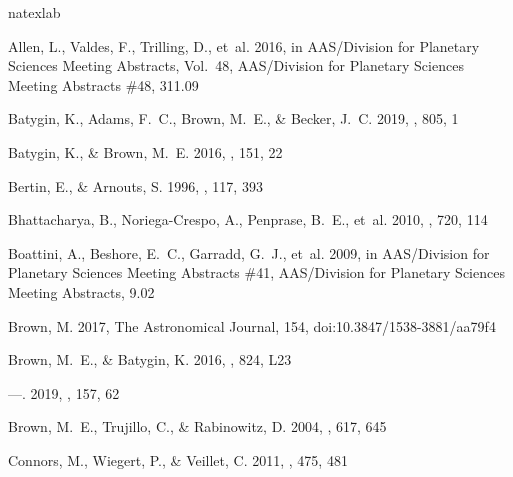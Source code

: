 \documentclass[twocolumn]{aastex62}
\begin{document}
\begin{thebibliography}{}
\expandafter\ifx\csname natexlab\endcsname\relax\def\natexlab#1{#1}\fi
\providecommand{\url}[1]{\href{#1}{#1}}

{Allen}, L., {Valdes}, F., {Trilling}, D., {et~al.} 2016, in AAS/Division for
  Planetary Sciences Meeting Abstracts, Vol.~48, AAS/Division for Planetary
  Sciences Meeting Abstracts \#48, 311.09

{Batygin}, K., {Adams}, F.~C., {Brown}, M.~E., \& {Becker}, J.~C. 2019,
  \physrep, 805, 1

{Batygin}, K., \& {Brown}, M.~E. 2016, \aj, 151, 22

{Bertin}, E., \& {Arnouts}, S. 1996, \aaps, 117, 393

{Bhattacharya}, B., {Noriega-Crespo}, A., {Penprase}, B.~E., {et~al.} 2010,
  \apj, 720, 114

{Boattini}, A., {Beshore}, E.~C., {Garradd}, G.~J., {et~al.} 2009, in
  AAS/Division for Planetary Sciences Meeting Abstracts \#41, AAS/Division for
  Planetary Sciences Meeting Abstracts, 9.02

Brown, M. 2017, The Astronomical Journal, 154, doi:10.3847/1538-3881/aa79f4

{Brown}, M.~E., \& {Batygin}, K. 2016, \apjl, 824, L23

---. 2019, \aj, 157, 62

{Brown}, M.~E., {Trujillo}, C., \& {Rabinowitz}, D. 2004, \apj, 617, 645

{Connors}, M., {Wiegert}, P., \& {Veillet}, C. 2011, \nat, 475, 481


\end{thebibliography}
\end{document}
